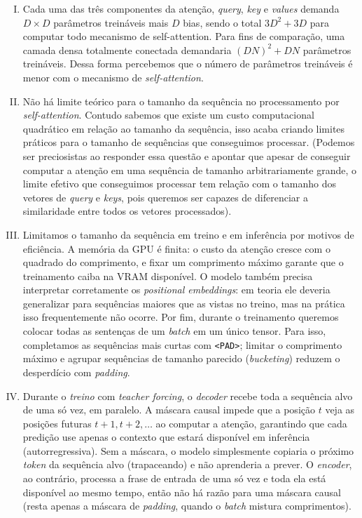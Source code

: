 \documentclass{dlproblemset}
\begin{document}
\begin{enumerate}[I)]
\item Cada uma das três componentes da atenção, \textit{query}, \textit{key} e \textit{values} demanda  $D\times D$ parâmetros treináveis mais $D$ bias, sendo o total $3D^2+3D$ para computar todo mecanismo de self-attention. Para fins de comparação, uma camada densa totalmente conectada demandaria $(DN)^2 + DN$ parâmetros treináveis.
Dessa forma percebemos que o número de parâmetros treináveis é menor com o mecanismo de \textit{self-attention}.

\item Não há limite teórico para o tamanho da sequência no processamento por \textit{self-attention}.
Contudo sabemos que existe um custo computacional quadrático em relação ao tamanho da sequência, isso acaba criando limites práticos para o tamanho de sequências que conseguimos processar.
(Podemos ser preciosistas ao responder essa questão e apontar que apesar de conseguir computar a atenção em uma sequência de tamanho arbitrariamente grande, o limite efetivo que conseguimos processar tem relação com o tamanho dos vetores de \textit{query} e \textit{keys}, pois queremos ser capazes de diferenciar a similaridade entre todos os vetores processados).

\item Limitamos o tamanho da sequência em treino e em inferência por motivos de eficiência.
A memória da GPU é finita: o custo da atenção cresce com o quadrado do comprimento, e fixar um comprimento máximo garante que o treinamento caiba na VRAM disponível.
O modelo também precisa interpretar corretamente os \textit{positional embeddings}: em teoria ele deveria generalizar para sequências maiores que as vistas no treino, mas na prática isso frequentemente não ocorre.
Por fim, durante o treinamento queremos colocar todas as sentenças de um \textit{batch} em um único tensor. Para isso, completamos as sequências mais curtas com \texttt{<PAD>}; limitar o comprimento máximo e agrupar sequências de tamanho parecido (\textit{bucketing}) reduzem o desperdício com \textit{padding}.

\item Durante o \textit{treino} com \textit{teacher forcing}, o \textit{decoder} recebe toda a sequência alvo de uma só vez, em paralelo. A máscara causal impede que a posição $t$ veja as posições futuras $t+1, t+2, \ldots$ ao computar a atenção, garantindo que cada predição use apenas o contexto que estará disponível em inferência (autorregressiva). Sem a máscara, o modelo simplesmente copiaria o próximo \textit{token} da sequência alvo (trapaceando) e não aprenderia a prever. O \textit{encoder}, ao contrário, processa a frase de entrada de uma só vez e toda ela está disponível ao mesmo tempo, então não há razão para uma máscara causal (resta apenas a máscara de \textit{padding}, quando o \textit{batch} mistura comprimentos).


\end{enumerate}
\end{document}
